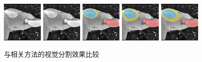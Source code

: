 \begin{figure}[h!]
    \\
    \includegraphics[width=0.18\textwidth]{image/chap04/seg/2_156input_ct.png}
    \includegraphics[width=0.18\textwidth]{image/chap04/seg/2_156lower.png}
    \includegraphics[width=0.18\textwidth]{image/chap04/seg/2_156pred.png}
    \includegraphics[width=0.18\textwidth]{image/chap04/seg/2_156upper.png}
    \includegraphics[width=0.18\textwidth]{image/chap04/seg/2_156gt.png}
    \\
    \caption{与相关方法的视觉分割效果比较}
    \label{fig:compare}
\end{figure}

